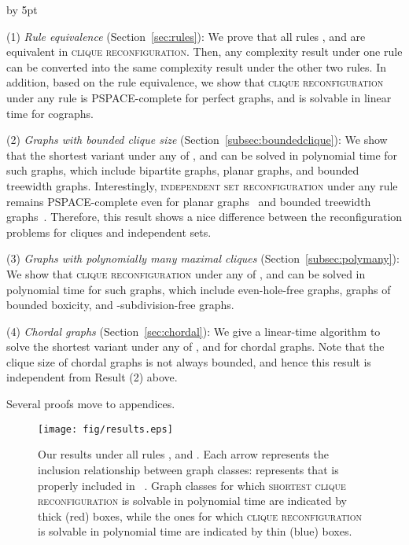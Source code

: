 \documentclass{llncs}
\newcounter{one}
\newcounter{two}
\begin{document}
\begin{list}{*}{\settowidth{\labelwidth}{(3)}\setlength{\leftmargin}{\labelwidth}\advance \leftmargin by 5pt
	\setlength{\itemsep}{5pt}\setlength{\parsep}{0pt}\setlength{\topsep}{0pt}\setlength{\parskip}{0pt}}
	\item[(1)] \emph{Rule equivalence} (Section~\ref{sec:rules}): We prove that  all rules ,  and  are equivalent in \textsc{clique reconfiguration}.
	Then, any complexity result under one rule can be converted into the same complexity result under the other two rules. 
In addition, based on the rule equivalence, we show that \textsc{clique reconfiguration} under any rule is PSPACE-complete for perfect graphs, and is solvable in linear time for cographs.

	\item[(2)] \emph{Graphs with bounded clique size} (Section~\ref{subsec:boundedclique}): We show that the shortest variant under any of ,  and  can be solved in polynomial time for such graphs, which include bipartite graphs, planar graphs, and bounded treewidth graphs.
	Interestingly, \textsc{independent set reconfiguration} under any rule remains PSPACE-complete even for planar graphs~\cite{BC09,HearnDemaine2005} and bounded treewidth graphs~\cite{Wro14}. 
	Therefore, this result shows a nice difference between the reconfiguration problems for cliques and independent sets. 

	\item[(3)] \emph{Graphs with polynomially many maximal cliques} (Section~\ref{subsec:polymany}): We  show that \textsc{clique reconfiguration} under any of ,  and  can be solved in polynomial time for such graphs, which include even-hole-free graphs, graphs of bounded boxicity, and -subdivision-free graphs.
	
	\item[(4)] \emph{Chordal graphs} (Section~\ref{sec:chordal}): We give a linear-time algorithm to solve the shortest variant under any of ,  and  for chordal graphs.
	Note that the clique size of chordal graphs is not always bounded, and hence this result is independent from Result (2) above. 
\end{list}
	Several proofs move to appendices. 


	\begin{figure}[t]
		\centering
		\texttt{[image: fig/results.eps]}
	\vspace{-1em}
	\caption{Our results under all rules ,  and . 
Each arrow represents the inclusion relationship between graph classes: 
 represents that  is properly included in ~\cite{BLS99}.
Graph classes for which \textsc{shortest clique reconfiguration} is solvable in polynomial time are indicated by thick (red) boxes, 
while the ones for which \textsc{clique reconfiguration} is solvable in polynomial time are indicated by thin (blue) boxes.}
	\vspace{-1em}
	\label{fig:results}
	\end{figure}
\end{document}
